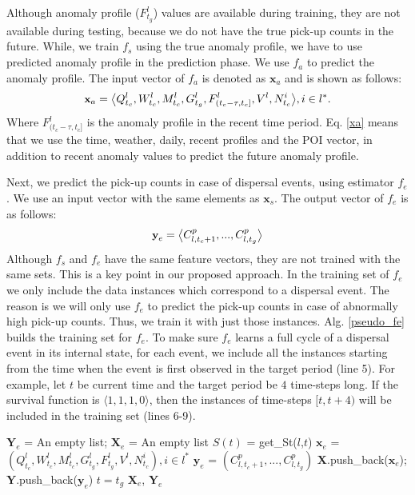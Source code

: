 \documentclass[letterpaper]{article} %
\begin{document}
Although anomaly profile ($F^l_{t_g}$) values are available during training, they are not available during testing, because we do not have the true pick-up counts in the future. While, we train $f_s$ using the true anomaly profile, we have to use predicted anomaly profile in the prediction phase. We use $f_a$ to predict the anomaly profile. The input vector of $f_a$ is denoted as $\textbf{x}_a$ and is shown as follows:
\begin{equation}
\small
\label{xa}
\textbf{x}_a=\big\langle Q^l_{t_c},W^l_{t_c},M^l_{t_c},G^{l}_{t_g},F^{l}_{{(t_c-\tau,t_c]}},V^l,N^i_{t_c} \big\rangle, i\in l^*.
\end{equation}
Where $F^{l}_{{(t_c-\tau,t_c]}}$ is the anomaly profile in the recent time period. Eq. \ref{xa} means that we use the time, weather, daily, recent profiles and the POI vector, in addition to recent anomaly values to predict the future anomaly profile.

Next, we predict the pick-up counts in case of dispersal events, using estimator $f_e$. We use an input vector with the same elements as $\textbf{x}_s$. The output vector of $f_e$ is as follows:
\begin{equation}
\small
\label{ye}
\textbf{y}_e=\big\langle C^p_{l,t_c+1},...,C^p_{l,t_g}\big\rangle
\end{equation}
Although $f_s$ and $f_e$ have the same feature vectors, they are not trained with the same sets. This is a key point in our proposed approach. In the training set of $f_e$ we only include the data instances which correspond to a dispersal event. The reason is we will only use $f_e$ to predict the pick-up counts in case of abnormally high pick-up counts. Thus, we train it with just those instances. Alg. \ref{pseudo_fe} builds the training set for $f_e$. To make sure $f_e$ learns a full cycle of a dispersal event in its internal state, for each event, we include all the instances starting from the time when the event is first observed in the target period (line 5). For example, let $t$ be current time and the target period be $4$ time-steps long. If the survival function is $\langle 1,1,1,0 \rangle$, then the instances of time-steps ${[t,t+4)}$ will be included in the training set (lines 6-9).

\begin{algorithm}
	\small
	\LinesNumbered
	\DontPrintSemicolon
	\BlankLine
	\caption{Build dataset for $f_e$ (get\_Xe)}
	\label{pseudo_fe}
	\BlankLine
	$\textbf{Y}_e$ = An empty list; $\textbf{X}_e$ = An empty list\;
	{
		{
			$S(t)$ = get\_St($l$,$t$)\;
			{
				{
					$\textbf{x}_e$ = $(Q^l_{t_c},W^l_{t_c},M^l_{t_c},G^{l}_{t_g},F^{l}_{t_g},V^l,N^i_{t_c}), i\in l^*$\;
					$\textbf{y}_e$ = $(C^p_{l,t_c+1},...,C^p_{l,t_g})$\;
					$\textbf{X}$.push\_back($\textbf{x}_e$); $\textbf{Y}$.push\_back($\textbf{y}_e$)\;
				}
				$t=t_g$\;
			}
		}
	}
	\Return $\textbf{X}_e$, $\textbf{Y}_e$\;
\end{algorithm}
\end{document}
